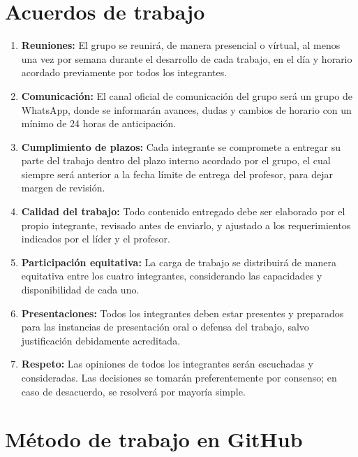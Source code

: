 \documentclass[11pt,a4paper]{article}
\begin{document}
\section{Acuerdos de trabajo}

\begin{enumerate}[label=\arabic*.]
    \item \textbf{Reuniones:} El grupo se reunir\'a, de manera presencial o v\'irtual, al menos una vez por semana durante el desarrollo de cada trabajo, en el d\'ia y horario acordado previamente por todos los integrantes.
    \item \textbf{Comunicaci\'on:} El canal oficial de comunicaci\'on del grupo ser\'a un grupo de WhatsApp, donde se informar\'an avances, dudas y cambios de horario con un m\'inimo de 24 horas de anticipaci\'on.
    \item \textbf{Cumplimiento de plazos:} Cada integrante se compromete a entregar su parte del trabajo dentro del plazo interno acordado por el grupo, el cual siempre ser\'a anterior a la fecha l\'imite de entrega del profesor, para dejar margen de revisi\'on.
    \item \textbf{Calidad del trabajo:} Todo contenido entregado debe ser elaborado por el propio integrante, revisado antes de enviarlo, y ajustado a los requerimientos indicados por el l\'ider y el profesor.
    \item \textbf{Participaci\'on equitativa:} La carga de trabajo se distribuir\'a de manera equitativa entre los cuatro integrantes, considerando las capacidades y disponibilidad de cada uno.
    \item \textbf{Presentaciones:} Todos los integrantes deben estar presentes y preparados para las instancias de presentaci\'on oral o defensa del trabajo, salvo justificaci\'on debidamente acreditada.
    \item \textbf{Respeto:} Las opiniones de todos los integrantes ser\'an escuchadas y consideradas. Las decisiones se tomar\'an preferentemente por consenso; en caso de desacuerdo, se resolver\'a por mayor\'ia simple.
\end{enumerate}

\section{M\'etodo de trabajo en GitHub}
\end{document}
